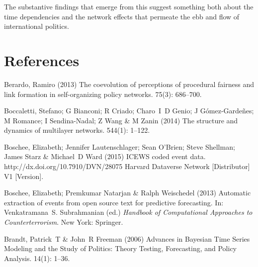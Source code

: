 \documentclass[3p,times,twocolumn,authoryear,12pt]{elsarticle}
\begin{document}
The substantive findings that emerge from this suggest something both about the time dependencies and the network effects that permeate the ebb and flow of international politics. 


\section*{References}

\begin{thebibliography}{}

Berardo, Ramiro (2013) The coevolution of perceptions of procedural fairness
  and link formation in self-organizing policy networks.
 { 75\/}(3): 686--700.

Boccaletti, Stefano; G Bianconi; R Criado; Charo~I~D Genio; J
  G{\'o}mez-Garde{\~n}es; M Romance; I Sendina-Nadal; Z Wang  \& M Zanin (2014)
  The structure and dynamics of multilayer networks.
 { 544\/}(1): 1--122.

Boschee, Elizabeth; Jennifer Lautenschlager; Sean O'Brien; Steve Shellman;
  James Starz  \& Michael~D Ward (2015) {ICEWS} coded event data.
\newblock http://dx.doi.org/10.7910/DVN/28075 Harvard Dataverse Network
  [Distributor] V1 [Version].

Boschee, Elizabeth; Premkumar Natarjan  \& Ralph Weischedel (2013) Automatic
  extraction of events from open source text for predictive forecasting.
\newblock In: Venkatramana~S. Subrahmanian (ed.) {\em Handbook of Computational
  Approaches to Counterterrorism}. New York: Springer.

Brandt, Patrick~T  \& John~R Freeman (2006) {Advances in Bayesian Time Series
  Modeling and the Study of Politics: Theory Testing, Forecasting, and Policy
  Analysis}.
 { 14\/}(1): 1--36.


\end{thebibliography}
\end{document}
